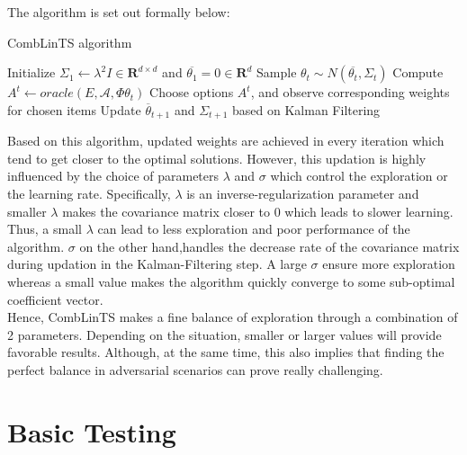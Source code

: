 The algorithm is set out formally below:
\begin{algorithm}
\caption{CombLinTS algorithm}\label{alg:comblints}
\begin{algorithmic}[0]
\State Initialize $\Sigma_1 \gets \lambda^2 I \in \mathbf{R}^{d \times d}$ and $\overline{\theta_1} = 0 \in \mathbf{R}^d$
\State Sample $\theta_t \sim N(\overline{\theta_t},\Sigma_t)$
\State Compute $A^t \gets oracle(E,\mathcal{A},\Phi \theta_t)$
\State Choose options $A^t$, and observe corresponding weights for chosen items
\State Update $\overline{\theta}_{t+1}$ and $\Sigma_{t+1}$ based on Kalman Filtering
\EndFor
{}
\end{algorithmic}
\end{algorithm}

Based on this algorithm, updated weights are achieved in every iteration which tend to get closer to the optimal solutions. However, this updation is highly influenced by the choice of parameters $\lambda$ and $\sigma$ which control the exploration or the learning rate. Specifically, $\lambda$ is an inverse-regularization parameter and smaller $\lambda$ makes the covariance matrix closer to 0 which leads to slower learning. Thus, a small $\lambda$ can lead to less exploration and poor performance of the algorithm. $\sigma$ on the other hand,handles the decrease rate of the covariance matrix during updation in the Kalman-Filtering step. A large $\sigma$ ensure more exploration whereas a small value makes the algorithm quickly converge to some sub-optimal coefficient vector.\\

Hence, CombLinTS makes a fine balance of exploration through a combination of 2 parameters. Depending on the situation, smaller or larger values will provide favorable results. Although, at the same time, this also implies that finding the perfect balance in adversarial scenarios can prove really challenging.

\pagebreak


\section{Basic Testing}

